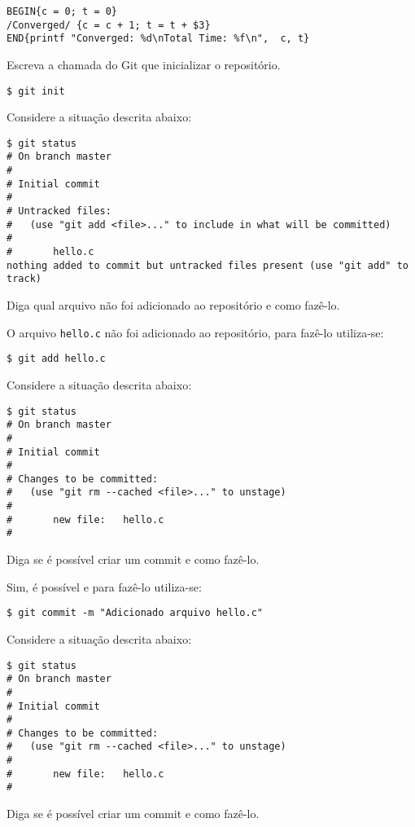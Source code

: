 \begin{Answer}[ref={007}]
  \begin{lstlisting}
BEGIN{c = 0; t = 0}
/Converged/ {c = c + 1; t = t + $3}
END{printf "Converged: %d\nTotal Time: %f\n",  c, t}
  \end{lstlisting}
\end{Answer}
\begin{Exercise}[label={0008}, difficulty={1}, origin={git}]
  Escreva a chamada do Git que inicializar o repositório.
\end{Exercise}

\begin{Answer}[ref={0008}]
  \begin{lstlisting}
$ git init
  \end{lstlisting}
\end{Answer}
\begin{Exercise}[label={0009}, difficulty={1}, origin={git}]
  Considere a situação descrita abaixo:
  \begin{lstlisting}
$ git status
# On branch master
#
# Initial commit
#
# Untracked files:
#   (use "git add <file>..." to include in what will be committed)
#
#       hello.c
nothing added to commit but untracked files present (use "git add" to track)
  \end{lstlisting}
  Diga qual arquivo não foi adicionado ao repositório e como fazê-lo.
\end{Exercise}

\begin{Answer}[ref={0009}]
  O arquivo \lstinline+hello.c+ não foi adicionado ao repositório, para fazê-lo
  utiliza-se:
  \begin{lstlisting}
$ git add hello.c
  \end{lstlisting}
\end{Answer}
\begin{Exercise}[label={0010}, difficulty={1}, origin={git}]
  Considere a situação descrita abaixo:
  \begin{lstlisting}
$ git status
# On branch master
#
# Initial commit
#
# Changes to be committed:
#   (use "git rm --cached <file>..." to unstage)
#
#       new file:   hello.c
#
  \end{lstlisting}
  Diga se é possível criar um commit e como fazê-lo.
\end{Exercise}

\begin{Answer}[ref={0010}]
  Sim, é possível e para fazê-lo utiliza-se:
  \begin{lstlisting}
$ git commit -m "Adicionado arquivo hello.c"
  \end{lstlisting}
\end{Answer}
\begin{Exercise}[label={0011}, difficulty={1}, origin={git}]
  Considere a situação descrita abaixo:
  \begin{lstlisting}
$ git status
# On branch master
#
# Initial commit
#
# Changes to be committed:
#   (use "git rm --cached <file>..." to unstage)
#
#       new file:   hello.c
#
  \end{lstlisting}
  Diga se é possível criar um commit e como fazê-lo.
\end{Exercise}

